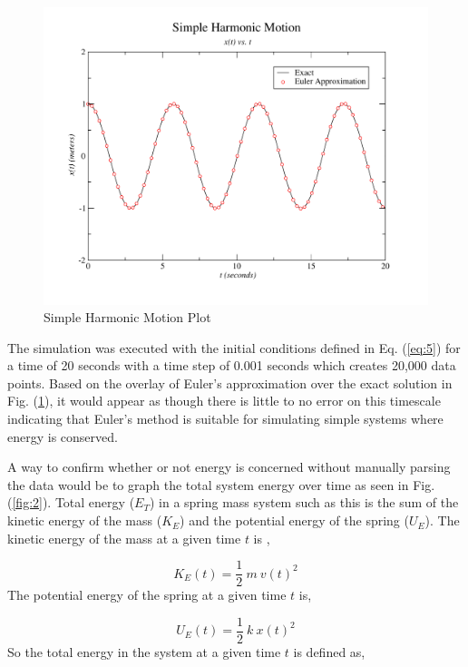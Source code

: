 \documentclass{article}
\begin{document}
\begin{figure}[H]
\begin{center}
\includegraphics[scale=0.59]{./results}
\end{center}
\caption{Simple Harmonic Motion Plot}
\label{fig:1}
\end{figure} 
\noindent 
The simulation was executed with the initial conditions defined in Eq. (\ref{eq:5}) for a time of 20 seconds with a time step of 0.001 seconds which creates 20,000 data points. Based on the overlay of Euler's approximation over the exact solution in Fig. (\ref{fig:1}), it would appear as though there is little to no error on this timescale indicating that Euler's method is suitable for simulating simple systems where energy is conserved.

\pagebreak
\noindent
A way to confirm whether or not energy is concerned without manually parsing the data would be to graph the total system energy over time as seen in Fig. (\ref{fig:2}). Total energy ($E_T$) in a spring mass system such as this is the sum of the kinetic energy of the mass ($K_E$) and the potential energy of the spring ($U_E$). The kinetic energy of the mass at a given time $t$ is ,

\begin{equation}
\label{eq:12}
K_E(t) = \frac{1}{2} \ m \ v(t)^2
\end{equation}
The potential energy of the spring at a given time $t$ is,

\begin{equation}
\label{eq:13}
U_E(t) = \frac{1}{2} \ k \ x(t)^2
\end{equation}
So the total energy in the system at a given time $t$ is defined as,
\end{document}
